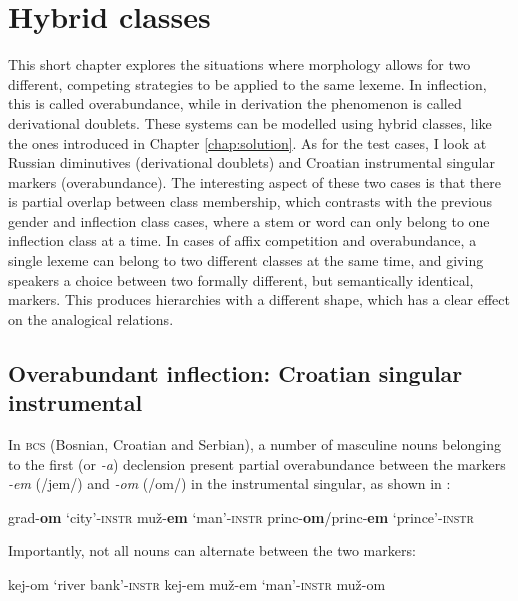 \chapter{Hybrid classes}\label{chap:hybrid}

This short chapter explores the situations where morphology allows for two different, competing strategies to be applied to the same lexeme. In inflection, this is called overabundance, while in derivation the phenomenon is called derivational doublets. These systems can be modelled using hybrid classes, like the ones introduced in Chapter \ref{chap:solution}. As for the test cases, I look at Russian diminutives (derivational doublets) and Croatian instrumental singular markers (overabundance). The interesting aspect of these two cases is that there is partial overlap between class membership, which contrasts with the previous gender and inflection class cases, where a stem or word can only belong to one inflection class at a time. In cases of affix competition and overabundance, a single lexeme can belong to two different classes at the same time, and giving speakers a choice between two formally different, but semantically identical, markers. This produces hierarchies with a different shape, which has a clear effect on the analogical relations.

\section{Overabundant inflection: Croatian singular instrumental}


In \textsc{bcs} (Bosnian, Croatian and Serbian), a number of masculine nouns belonging to the first (or \textit{-a}) declension present partial overabundance between the markers \textit{-em} (/jem/) and \textit{-om} (/om/) in the instrumental singular, as shown in :

\begin{exe}
    \ex \label{exe-over-croat}
    \begin{xlist}
        \ex grad-\textbf{om} `city'-\textsc{instr}
        \ex muž-\textbf{em} `man'-\textsc{instr}
        \ex princ-\textbf{om}/princ-\textbf{em} `prince'-\textsc{instr}
    \end{xlist}
\end{exe}

Importantly, not all nouns can alternate between the two markers:

\begin{exe}
    \ex \label{no-over-croat}
    \begin{xlist}
        \ex kej-om `river bank'-\textsc{instr}
        \ex * kej-em
        \ex muž-em `man'-\textsc{instr}
        \ex * muž-om
    \end{xlist}
\end{exe}

